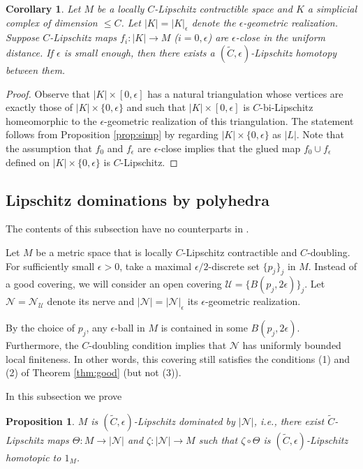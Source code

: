 \documentclass[a4paper,12pt]{amsart}
\theoremstyle{plain}
\newtheorem{cor}[thm]{Corollary}
\newtheorem{prop}[thm]{Proposition}
\theoremstyle{definition}
\numberwithin{thm}{section}
\numberwithin{equation}{section}
\begin{document}
\begin{cor}\label{cor:simp}
Let $M$ be a locally $C$-Lipschitz contractible space and $K$ a simplicial complex of dimension $\le C$.
Let $|K|=|K|_\epsilon$ denote the $\epsilon$-geometric realization.
Suppose $C$-Lipschitz maps $f_i:|K|\to M$ ($i=0,\epsilon$) are $\epsilon$-close in the uniform distance.
If $\epsilon$ is small enough, then there exists a $(\tilde C,\epsilon)$-Lipschitz homotopy between them.
\end{cor}

\begin{proof}
Observe that $|K|\times[0,\epsilon]$ has a natural triangulation whose vertices are exactly those of $|K|\times\{0,\epsilon\}$ and such that $|K|\times[0,\epsilon]$ is $C$-bi-Lipschitz homeomorphic to the $\epsilon$-geometric realization of this triangulation.
The statement follows from Proposition \ref{prop:simp} by regarding $|K|\times\{0,\epsilon\}$ as $|L|$.
Note that the assumption that $f_0$ and $f_\epsilon$ are $\epsilon$-close implies that the glued map $f_0\cup f_\epsilon$ defined on $|K|\times\{0,\epsilon\}$ is $C$-Lipschitz.
\end{proof}

\subsection{Lipschitz dominations by polyhedra}\label{sec:dom}

The contents of this subsection have no counterparts in \cite{Peter}.

Let $M$ be a metric space that is locally $C$-Lipschitz contractible and $C$-doubling.
For sufficiently small $\epsilon>0$, take a maximal $\epsilon/2$-discrete set $\{p_j\}_j$ in $M$.
Instead of a good covering, we will consider an open covering $\mathcal U=\{B(p_j,2\epsilon)\}_j$.
Let $\mathcal N=\mathcal N_\mathcal U$ denote its nerve and $|\mathcal N|=|\mathcal N|_\epsilon$ its $\epsilon$-geometric realization.

By the choice of $p_j$, any $\epsilon$-ball in $M$ is contained in some $B(p_j,2\epsilon)$.
Furthermore, the $C$-doubling condition implies that $\mathcal N$ has uniformly bounded local finiteness.
In other words, this covering still satisfies the conditions (1) and (2) of Theorem \ref{thm:good} (but not (3)).

In this subsection we prove

\begin{prop}\label{prop:dom}
$M$ is $(\tilde C,\epsilon)$-Lipschitz dominated by $|\mathcal N|$, i.e., there exist $\tilde C$-Lipschitz maps $\Theta:M\to |\mathcal N|$ and $\zeta:|\mathcal N|\to M$ such that $\zeta\circ\Theta$ is $(\tilde C,\epsilon)$-Lipschitz homotopic to $1_M$.
\end{prop}
\end{document}
